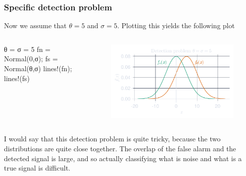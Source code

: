 \documentclass[compress,aspectratio=169]{beamer}
\begin{document}
\begin{frame}[fragile] %
    \frametitle{Specific detection problem}
    Now we assume that $\theta = 5$ and $\sigma = 5$. Plotting this yields the 
    following plot
    \begin{columns}
        \begin{column}{0.5\textwidth}
            \begin{jllisting}[gobble=16]
                θ = σ = 5
                fn = Normal(0,σ); fs = Normal(θ,σ)
                lines!(fn); lines!(fs)
            \end{jllisting}
        \end{column}
        \begin{column}{0.5\textwidth}
            \begin{figure}
                \includegraphics[width=\columnwidth]{"../b.pdf"}
            \end{figure}
        \end{column}
    \end{columns}
    I would say that this detection problem is quite tricky, because the two
    distributions are quite close together. The overlap of the false alarm and
    the detected signal is large, and so actually classifying what is noise
    and what is a true signal is difficult.
\end{frame} 
\end{document}
